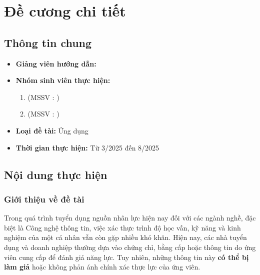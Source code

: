 \chapter*{Đề cương chi tiết}

\renewcommand{\thesection}{}

\section*{\thesection\quad Thông tin chung}

\begin{itemize}[label = {}]
  \item \textbf{Giảng viên hướng dẫn:}
        \begin{itemize}
          \advisorfulltitle
        \end{itemize}{}
  \item \textbf{Nhóm sinh viên thực hiện:}
        \begin{enumerate}
          \item \studentonename{} (MSSV : \studentoneid)
          \item \studenttwoname{} (MSSV : \studenttwoid)
        \end{enumerate}
  \item \textbf{Loại đề tài:} Ứng dụng
  \item \textbf{Thời gian thực hiện:} Từ 3/2025 đến 8/2025
\end{itemize}

\section*{\thesection\quad Nội dung thực hiện}

\subsection*{\thesubsection\quad Giới thiệu về đề tài}

Trong quá trình tuyển dụng nguồn nhân lực hiện nay đối với các ngành nghề, đặc biệt là Công nghệ thông tin,
việc xác thực trình độ học vấn, kỹ năng và kinh nghiệm của một cá nhân vẫn còn gặp nhiều khó khăn.
Hiện nay, các nhà tuyển dụng và doanh nghiệp thường dựa vào chứng chỉ, bằng cấp hoặc thông tin do ứng viên cung cấp để đánh giá năng lực.
Tuy nhiên, những thông tin này \textbf{có thể bị làm giả} hoặc không phản ánh chính xác thực lực của ứng viên.

